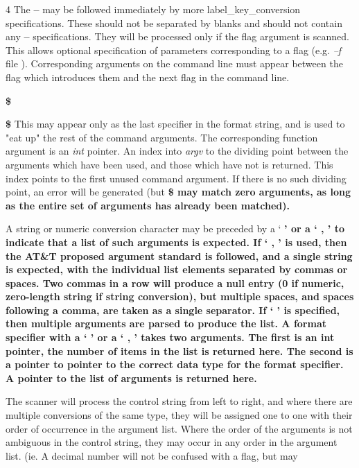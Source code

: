  4
The
{\bf --}
may be followed immediately by more label\_key\_conversion specifications.
These should not be separated by blanks and should not contain any
{\bf --}
specifications.  They will be processed only if the flag argument is scanned.
This allows optional specification of parameters corresponding to a flag
(e.g.
{\it --f} file
).  Corresponding arguments on the command line must appear between the flag
which introduces them and the next flag in the command line.
\begin{TPlist}{\bf\$}
\item[{\bf\$}]
This may appear only as the last specifier in the format string, and is used
to "eat up" the rest of the command arguments.  The corresponding function
argument is an
{\it int}
pointer.  An index into
{\it argv}
to the dividing point between the arguments which have been used, and those
which have not is returned.  This index points to the first unused command
argument.  If there is no such dividing point, an error
will be generated (but %
\bf \$ \rm%
may match zero arguments, as long as
the entire set of arguments has already been matched).
\end{TPlist}\par
A string or numeric conversion character may be preceded by a
`%
\bf *\rm%
' or a `%
\bf ,\rm%
' to indicate that a list of such arguments is
expected.  If `%
\bf ,\rm%
' is used, then the AT\&T proposed argument
standard is followed, and a single string is expected, with the
individual list elements separated by commas or spaces.  Two commas in
a row will produce a null entry (0 if numeric, zero-length string if
string conversion), but multiple spaces, and spaces following a comma,
are taken as a single separator.  If
`%
\bf *\rm%
'
is specified, then multiple arguments are parsed to produce the list.  A
format specifier with a
`%
\bf *\rm%
'
or a
`%
\bf ,\rm%
'
takes two arguments.  The first is an
{\bf int}
pointer, the number of items in the list is returned here.  The second is a
pointer to pointer to the correct data type for the format specifier.  A
pointer to the list of arguments is returned here.
\par
The scanner will process the control string from left to right,
and where there are multiple conversions of the same type, they will
be assigned one to one with their order of occurrence in the argument list.
Where the order of the arguments is not ambiguous in the control string,
they may occur in any order in the argument list. (ie. A decimal number
will not be confused with a flag, but may
